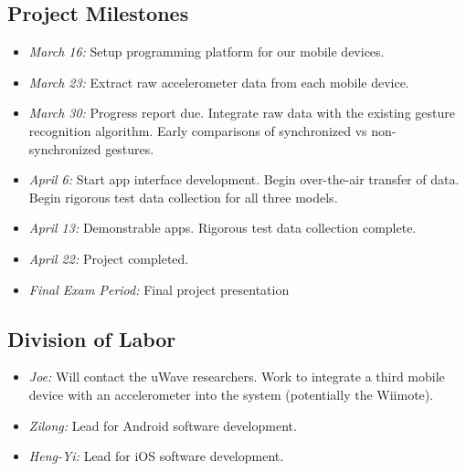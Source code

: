 
\subsection{Project Milestones}
\label{sec:Milestones}

\begin{itemize}
\item \emph{March 16:} Setup programming platform for our mobile devices. 
\item \emph{March 23:} Extract raw accelerometer data from each mobile device.
\item \emph{March 30:} Progress report due. Integrate raw data with the existing gesture recognition algorithm. Early comparisons of synchronized vs non-synchronized gestures.
\item \emph{April 6:} Start app interface development. Begin over-the-air transfer of data. Begin rigorous test data collection for all three models.
\item \emph{April 13:} Demonstrable apps. Rigorous test data collection complete. 
\item \emph{April 22:} Project completed. 
\item \emph{Final Exam Period:} Final project presentation
\end{itemize}

\subsection{Division of Labor}

\begin{itemize}
\item \emph{Joe:} Will contact the uWave researchers. Work to integrate a third mobile device with an accelerometer into the system (potentially the Wiimote).
\item \emph{Zilong:} Lead for Android software development. 
\item \emph{Heng-Yi:} Lead for iOS software development. 
\end{itemize}

